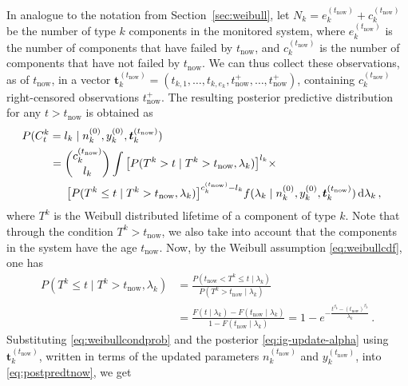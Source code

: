 \documentclass[authoryear]{elsarticle}
\newcommand{\dd}{\,\mathrm{d}}
\renewcommand{\vec}[1]{{\bm#1}}
\newcommand{\uz}{^{(0)}} %
\def\ykz{y\uz_k}
\def\nkz{n\uz_k}
\def\yknow{y_k^{(\tnow)}}
\def\nknow{n_k^{(\tnow)}}
\def\tnow{t_\text{now}}
\def\tpnow{t^+_\text{now}}
\def\eknow{e_k^{(\tnow)}}
\def\cknow{c_k^{(\tnow)}}
\def\vectknow{\vec{t}_k^{(\tnow)}}
\begin{document}
In analogue to the notation from Section~\ref{sec:weibull},
let $N_k = \eknow + \cknow$ be the number of type $k$ components in the monitored system,
where $\eknow$ is the number of components that have failed by $\tnow$,
and $\cknow$ is the number of components that have not failed by $\tnow$.
We can thus collect these observations, as of $\tnow$, in a vector
$\vectknow = (t_{k,1}, \ldots, t_{k,e_k}, \tpnow, \ldots, \tpnow)$,
containing $\cknow$ right-censored observations $\tpnow$.
%
The resulting posterior predictive distribution for any $t > \tnow$ is obtained as
\begin{align}
\lefteqn{%
P(C^k_t = l_k\mid\nkz,\ykz, \vectknow) }\hspace*{5.75ex} \nonumber\\  %
 &= { \cknow \choose l_k} \int \big[P(T^k >    t \mid T^k > \tnow, \lambda_k)\big]^{l_k} \times \nonumber\\ & \hspace*{3.5ex}
                               \big[P(T^k \leq t \mid T^k > \tnow, \lambda_k)\big]^{\cknow - l_k}
    f(\lambda_k\mid\nkz,\ykz,\vectknow) \dd \lambda_k\,,
\label{eq:postpredtnow}
\end{align}
where $T^k$ is the Weibull distributed lifetime of a component of type $k$.
Note that through the condition $T^k > \tnow$, we also take into account
that the components in the system have the age $\tnow$.
Now, by the Weibull assumption \eqref{eq:weibullcdf}, one has
\begin{align}
P(T^k \leq t \mid T^k > \tnow, \lambda_k)
 &= \frac{P(\tnow < T^k \leq t \mid\lambda_k)}{P(T^k > \tnow \mid \lambda_k)} \nonumber\\
 &= \frac{F(t\mid\lambda_k) - F(\tnow\mid\lambda_k)}{1-F(\tnow\mid\lambda_k)} 
  = 1 - e^{-\frac{t^{\beta_k} - (\tnow)^{\beta_k}}{\lambda_k}}\,.
\label{eq:weibullcondprob}
\end{align}
Substituting \eqref{eq:weibullcondprob} and the posterior \eqref{eq:ig-update-alpha} using $\vectknow$,
written in terms of the updated parameters $\nknow$ and $\yknow$,
into \eqref{eq:postpredtnow}, we get
\end{document}
